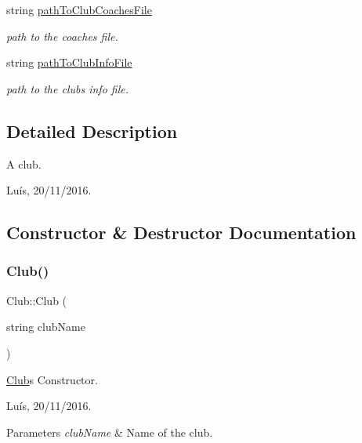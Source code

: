 \begin{DoxyCompactItemize}
string \hyperlink{class_club_adf720213158504d95078824fc769918e}{path\+To\+Club\+Coaches\+File}
\begin{DoxyCompactList}\small\item\em path to the coaches\textquotesingle{} file. \end{DoxyCompactList}\item 
string \hyperlink{class_club_a01f1d1dc26bca7dda9ceea7521d294eb}{path\+To\+Club\+Info\+File}
\begin{DoxyCompactList}\small\item\em path to the club\textquotesingle{}s info file. \end{DoxyCompactList}\end{DoxyCompactItemize}


\subsection{Detailed Description}
A club. 

Luís, 20/11/2016. 

\subsection{Constructor \& Destructor Documentation}
\hypertarget{class_club_a53bcd4e9c5b32098f2170d6800b4279a}{}\label{class_club_a53bcd4e9c5b32098f2170d6800b4279a} 
\subsubsection{\texorpdfstring{Club()}{Club()}\hspace{0.1cm}{\footnotesize\ttfamily [1/2]}}
{\footnotesize\ttfamily Club\+::\+Club (\begin{DoxyParamCaption}\item[{string}]{club\+Name }\end{DoxyParamCaption})}



\hyperlink{class_club}{Club}\textquotesingle{}s Constructor. 

Luís, 20/11/2016. 


\begin{DoxyParams}{Parameters}
{\em club\+Name} & Name of the club. \\
\hline
\end{DoxyParams}
\hypertarget{class_club_a07cefb3e65bdcd9144abc29d3203bf4b}{}\label{class_club_a07cefb3e65bdcd9144abc29d3203bf4b} 
